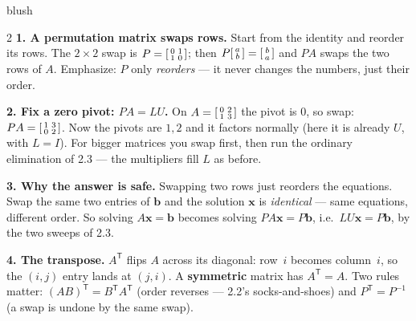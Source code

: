 \documentclass[10pt]{article}
\newcommand{\xx}{\mathbf{x}}
\newcommand{\bb}{\mathbf{b}}
\newcommand{\PP}{P}
\newcommand{\tp}{\mathsf{T}}
\begin{document}
\begin{skillbox}[Lesson]{blush}
\begin{multicols}{2}
\textbf{1. A permutation matrix swaps rows.} Start from the identity and reorder its rows. The
$2\times2$ swap is $\PP=\begin{bsmallmatrix} 0&1\\1&0 \end{bsmallmatrix}$; then $\PP\begin{bsmallmatrix} a\\b \end{bsmallmatrix}=\begin{bsmallmatrix} b\\a \end{bsmallmatrix}$
and $\PP A$ swaps the two rows of $A$. Emphasize: $\PP$ only \emph{reorders} --- it never changes the
numbers, just their order.

\textbf{2. Fix a zero pivot: $\PP A=LU$.} On $A=\begin{bsmallmatrix} 0&2\\1&3 \end{bsmallmatrix}$ the pivot is
$0$, so swap: $\PP A=\begin{bsmallmatrix} 1&3\\0&2 \end{bsmallmatrix}$. Now the pivots are $1,2$ and it
factors normally (here it is already $U$, with $L=I$). For bigger matrices you swap first, then run the
ordinary elimination of 2.3 --- the multipliers fill $L$ as before.

\columnbreak

\textbf{3. Why the answer is safe.} Swapping two rows just reorders the equations. Swap the same two
entries of $\bb$ and the solution $\xx$ is \emph{identical} --- same equations, different order. So
solving $A\xx=\bb$ becomes solving $\PP A\xx=\PP\bb$, i.e.\ $LU\xx=\PP\bb$, by the two sweeps of 2.3.

\textbf{4. The transpose.} $A^{\tp}$ flips $A$ across its diagonal: row~$i$ becomes column~$i$, so the
$(i,j)$ entry lands at $(j,i)$. A \textbf{symmetric} matrix has $A^{\tp}=A$. Two rules matter:
$(AB)^{\tp}=B^{\tp}A^{\tp}$ (order reverses --- 2.2's socks-and-shoes) and $\PP^{\tp}=\PP^{-1}$ (a swap
is undone by the same swap).
\end{multicols}
\end{skillbox}
\end{document}
